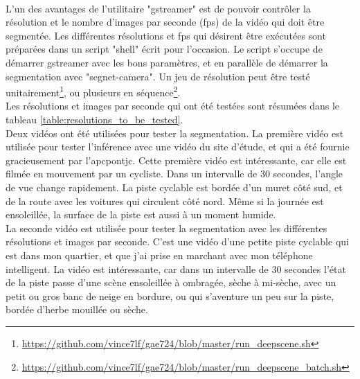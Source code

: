 \vspace{0.5\baselineskip}
\\
\noindent L'un des avantages de l'utilitaire "gstreamer" est de pouvoir contrôler la résolution et le nombre d'images par seconde (\acrshort{fps}) de la vidéo qui doit être segmentée. Les différentes résolutions et \acrshort{fps} qui désirent être exécutées sont préparées dans un script "shell" écrit pour l'occasion. Le script s'occupe de démarrer gstreamer avec les bons paramètres, et en parallèle de démarrer la segmentation avec "segnet-camera". Un jeu de résolution peut être testé unitairement\footnote{\url{https://github.com/vince7lf/gae724/blob/master/run_deepscene.sh}}, ou plusieurs en séquence\footnote{\url{https://github.com/vince7lf/gae724/blob/master/run_deepscene_batch.sh}}. 
\vspace{0.5\baselineskip}
\\
\noindent Les résolutions et images par seconde qui ont été testées sont résumées dans le tableau \ref{table:resolutions_to_be_tested}. 
\vspace{0.5\baselineskip}
\\
\noindent Deux vidéos ont été utilisées pour tester la segmentation. La première vidéo est utilisée pour tester l'inférence avec une vidéo du site d'étude, et qui a été fournie gracieusement par l'\acrshort{apcpontjc}. Cette première vidéo est intéressante, car elle est filmée en mouvement par un cycliste. Dans un intervalle de 30 secondes, l'angle de vue change rapidement. La piste cyclable est bordée d'un muret côté sud, et de la route avec les voitures qui circulent côté nord. Même si la journée est ensoleillée, la surface de la piste est aussi à un moment humide.
\vspace{0.5\baselineskip}
\\
\noindent La seconde vidéo est utilisée pour tester la segmentation avec les différentes résolutions et images par seconde. C'est une vidéo d'une petite piste cyclable qui est dans mon quartier, et que j'ai prise en marchant avec mon téléphone intelligent. La vidéo est intéressante, car dans un intervalle de 30 secondes l'état de la piste passe d'une scène ensoleillée à ombragée, sèche à mi-sèche, avec un petit ou gros banc de neige en bordure, ou qui s'aventure un peu sur la piste, bordée d'herbe mouillée ou sèche.
